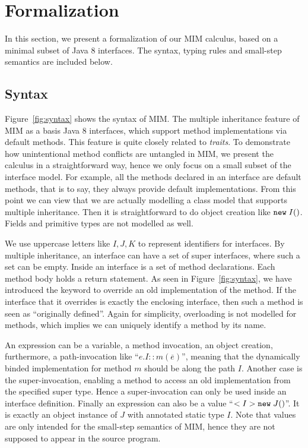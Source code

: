 \section{Formalization}

In this section, we present a formalization of our MIM calculus, based on
a minimal subset of Java 8 interfaces. The syntax, typing rules and small-step
semantics are included below.

\subsection{Syntax} 

Figure~\ref{fig:syntax} shows the syntax of MIM. The multiple
inheritance feature of MIM as a basis Java 8 interfaces, which support
method implementations via default methods. This feature is quite
closely related to \emph{traits}\cite{}.  To demonstrate how
unintentional method conflicts are untangled in MIM, we present the
calculus in a straightforward way, hence we only focus on a small
subset of the interface model. For example, all the methods declared
in an interface are default methods, that is to say, they always
provide default implementations.  From this point we can view that we
are actually modelling a class model that supports multiple
inheritance. Then it is straightforward to do object creation like
$\texttt{new} \; I()$. Fields and primitive types are not modelled as well.

We use uppercase letters like $I, J, K$ to represent identifiers for
interfaces. By multiple inheritance, an interface can have a set of
super interfaces, where such a set can be empty. Inside an interface
is a set of method declarations. Each method body holds a return
statement. As seen in Figure~\ref{fig:syntax}, we have introduced the
\kwoverride{} keyword to override an old implementation of the
method. If the interface that it overrides is exactly the enclosing
interface, then such a method is seen as ``originally defined''.
Again for simplicity, overloading is not modelled for methods, which
implies we can uniquely identify a method by its name.

An expression can be a variable, a method invocation, an object
creation, furthermore, a path-invocation like
``$e.I::m(\overline{e})$'', meaning that the dynamically binded
implementation for method $m$ should be along the path $I$. Another
case is the super-invocation, enabling a method to access an old
implementation from the specified super type. Hence a super-invocation
can only be used inside an interface definition. Finally an expression
can also be a value ``$<I> \texttt{new} \; J()$''. It is exactly an object instance
of $J$ with annotated static type $I$.  Note that values are only
intended for the small-step semantics of MIM, hence they are not
supposed to appear in the source program.


